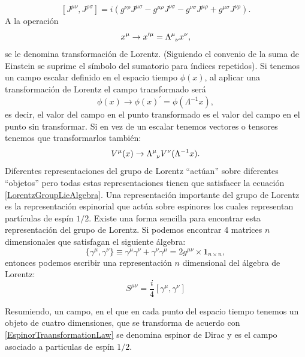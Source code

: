 \documentclass{article}
\theoremstyle{plain}
\theoremstyle{definition}
\newcommand{\LambdaMuNu}{{\tensor{\Lambda}{^{\mu}_\nu}}}
\begin{document}
	\begin{dmath}\label{LorentzGroupLieAlgebra}
		\left[J^{\mu\nu},J^{\rho\sigma}\right] =i\left(g^{\nu\rho}J^{\mu\sigma}-g^{\mu\rho}J^{\nu\sigma}-g^{\nu\sigma}J^{\mu\rho}+g^{\mu\sigma}J^{\nu\rho}\right)\text{.} 
	\end{dmath}
	A la operación \[x^\mu\rightarrow x^{\prime\mu} = \LambdaMuNu x^\nu,\] se le denomina transformación de Lorentz. (Siguiendo el convenio de la suma de Einstein se suprime el símbolo del sumatorio para índices repetidos). Si tenemos un campo escalar definido en el espacio tiempo \(\phi(x)\), al aplicar una transformación de Lorentz el campo transformado será \[\phi(x) \rightarrow\phi(x)^\prime = \phi(\Lambda^{-1} x),\]
	es decir, el valor del campo en el punto transformado es el valor del campo en el punto sin transformar. Si en vez de un escalar tenemos vectores o tensores tenemos que transformarlos también: \[
	V^\mu(x)\rightarrow\LambdaMuNu V^\nu(\Lambda^{-1}x)\text{.}
	\] Diferentes representaciones del grupo de Lorentz ``actúan'' sobre diferentes ``objetos'' pero todas estas representaciones tienen que satisfacer la ecuación \eqref{LorentzGroupLieAlgebra}. Una representación importante del grupo de Lorentz es la representación espinorial que actúa sobre espinores los cuales representan partículas de espín \(1/2\text{.}\) Existe una forma sencilla para encontrar esta representación del grupo de Lorentz. Si podemos encontrar 4 matrices \(n\) dimensionales que satisfagan el siguiente álgebra: \[
	\{\gamma^\mu,\gamma^\nu \} \equiv \gamma^\mu\gamma^\nu + \gamma^\nu\gamma^\mu = 2g^{\mu\nu} \times \boldsymbol{1}_{n\times n},
	\]
	entonces podemos escribir una representación \(n\) dimensional del álgebra de Lorentz: 
	\begin{dmath}\label{EspinorTraansformationLaw}
		S^{\mu\nu} = \frac{i}{4}\left[\gamma^{\mu},\gamma^{\nu} \right]
	\end{dmath}
	
	
	Resumiendo, un campo, en el que en cada punto del espacio tiempo tenemos un objeto de cuatro dimensiones, que se transforma de acuerdo con \eqref{EspinorTraansformationLaw} se denomina espinor de Dirac y es el campo asociado a particulas de espín \(1/2\).
	
	
	
	
\end{document}

